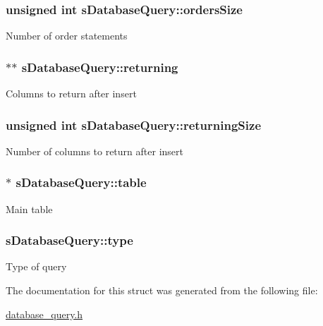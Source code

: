 \subsubsection[{\texorpdfstring{orders\+Size}{ordersSize}}]{\setlength{\rightskip}{0pt plus 5cm}unsigned int s\+Database\+Query\+::orders\+Size}\hypertarget{structsDatabaseQuery_aecb5648962f556532a3a2c91b4970397}{}\label{structsDatabaseQuery_aecb5648962f556532a3a2c91b4970397}
Number of order statements 
\subsubsection[{\texorpdfstring{returning}{returning}}]{$\ast$$\ast$ s\+Database\+Query\+::returning}\hypertarget{structsDatabaseQuery_ad88d21177dbe929109914b4b75665454}{}\label{structsDatabaseQuery_ad88d21177dbe929109914b4b75665454}
Columns to return after insert 
\subsubsection[{\texorpdfstring{returning\+Size}{returningSize}}]{\setlength{\rightskip}{0pt plus 5cm}unsigned int s\+Database\+Query\+::returning\+Size}\hypertarget{structsDatabaseQuery_a08dafb08cb00fac230eaceb0dfd20c9f}{}\label{structsDatabaseQuery_a08dafb08cb00fac230eaceb0dfd20c9f}
Number of columns to return after insert 
\subsubsection[{\texorpdfstring{table}{table}}]{$\ast$ s\+Database\+Query\+::table}\hypertarget{structsDatabaseQuery_a8d34ce4ad0e31c1bc8978ec03d4b5fbf}{}\label{structsDatabaseQuery_a8d34ce4ad0e31c1bc8978ec03d4b5fbf}
Main table 
\subsubsection[{\texorpdfstring{type}{type}}]{ s\+Database\+Query\+::type}\hypertarget{structsDatabaseQuery_a5b7daf6543a0c36ab9b6a2a948f953bb}{}\label{structsDatabaseQuery_a5b7daf6543a0c36ab9b6a2a948f953bb}
Type of query 

The documentation for this struct was generated from the following file\+:\begin{DoxyCompactItemize}
\item 
\hyperlink{database__query_8h}{database\+\_\+query.\+h}\end{DoxyCompactItemize}
